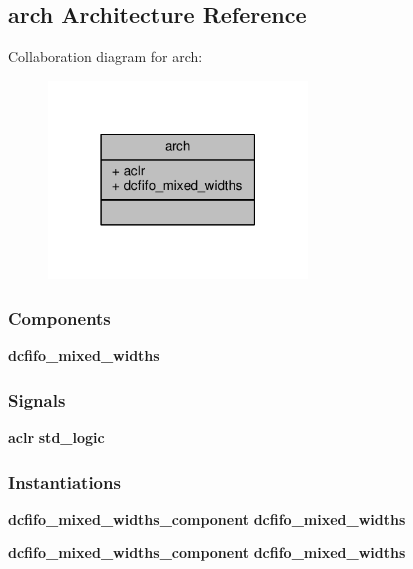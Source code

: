 \subsection{arch Architecture Reference}
\label{classfifo__inst_1_1arch}


Collaboration diagram for arch\+:\nopagebreak
\begin{figure}[H]
\begin{center}
\leavevmode
\includegraphics[width=195pt]{d7/d12/classfifo__inst_1_1arch__coll__graph}
\end{center}
\end{figure}
\subsubsection*{Components}
 \begin{DoxyCompactItemize}
\item 
{\bf dcfifo\+\_\+mixed\+\_\+widths}  {\bfseries }  
\end{DoxyCompactItemize}
\subsubsection*{Signals}
 \begin{DoxyCompactItemize}
\item 
{\bf aclr} {\bfseries \textcolor{comment}{std\+\_\+logic}\textcolor{vhdlchar}{ }} 
\end{DoxyCompactItemize}
\subsubsection*{Instantiations}
 \begin{DoxyCompactItemize}
\item 
{\bf dcfifo\+\_\+mixed\+\_\+widths\+\_\+component}  {\bfseries dcfifo\+\_\+mixed\+\_\+widths}   
\item 
{\bf dcfifo\+\_\+mixed\+\_\+widths\+\_\+component}  {\bfseries dcfifo\+\_\+mixed\+\_\+widths}   
\end{DoxyCompactItemize}


